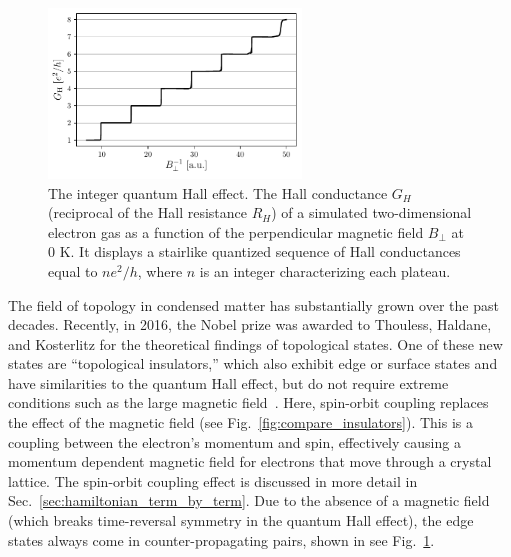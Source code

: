\begin{figure}[!htb]
\begin{center}
\includegraphics[width=0.6\textwidth]{chapter_introduction/figures/qhe.pdf}
\caption{
The integer quantum Hall effect.
The Hall conductance $G_H$ (reciprocal of the Hall resistance $R_H$) of a simulated two-dimensional electron gas as a function of the perpendicular magnetic field $B_\perp$ at 0 K.
It displays a stairlike quantized sequence of Hall conductances equal to $ne^2/h$, where $n$ is an integer characterizing each plateau.
\label{fig:qhe_example}}
\end{center}
\end{figure}

The field of topology in condensed matter has substantially grown over the past decades.
Recently, in 2016, the Nobel prize was awarded to Thouless, Haldane, and Kosterlitz for the theoretical findings of topological states.
One of these new states are ``topological insulators,'' which also exhibit edge or surface states and have similarities to the quantum Hall effect, but do not require extreme conditions such as the large magnetic field~\cite{Fu2007a,Fu2007b,Kane2011,Hasan2010,Moore2006}.
Here, spin-orbit coupling replaces the effect of the magnetic field (see Fig.~\ref{fig:compare_insulators}).
This is a coupling between the electron's momentum and spin, effectively causing a momentum dependent magnetic field for electrons that move through a crystal lattice.
The spin-orbit coupling effect is discussed in more detail in Sec.~\ref{sec:hamiltonian_term_by_term}.
Due to the absence of a magnetic field (which breaks time-reversal symmetry in the quantum Hall effect), the edge states always come in counter-propagating pairs, shown in see Fig.~\ref{fig:qhe_example}.

